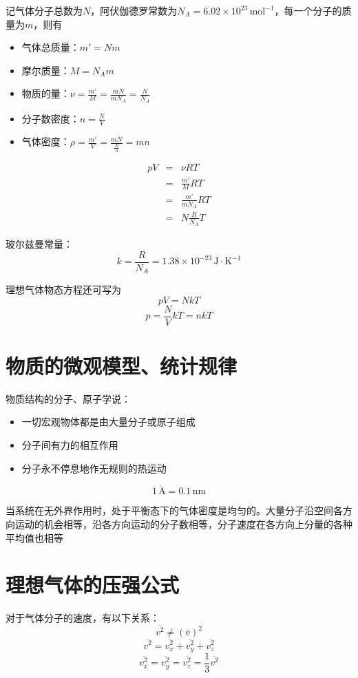 \documentclass[12pt, a4paper, twoside]{ctexbook}
\begin{document}
记气体分子总数为$N$，阿伏伽德罗常数为$N_A=6.02\times10^{23}\,\mathrm{mol}^{-1}$，每一个分子的质量为$m$，则有
\begin{itemize}
    \item {\sonti 气体总质量}：$m'=Nm$
    \item {\sonti 摩尔质量}：$M=N_Am$
    \item {\sonti 物质的量}：$\nu=\frac{m'}{M}=\frac{mN}{mN_A}=\frac{N}{N_A}$
    \item {\sonti 分子数密度}：$n=\frac{N}{V}$
    \item {\sonti 气体密度}：$\rho=\frac{m'}{V}=\frac{mN}{\frac{N}{n}}=mn$
\end{itemize}
\begin{eqnarray}
    pV&=&\nu RT \nonumber      \\
    ~&=&\frac{m'}{M}RT \nonumber    \\
    ~&=&\frac{m'}{mN_A}RT \nonumber		\\
    ~&=&N\frac{R}{N_A}T \nonumber
\end{eqnarray}

{\sonti 玻尔兹曼常量}：
$$
k=\frac{R}{N_A}=1.38\times10^{-23}\,\mathrm{J}\cdot\mathrm{K}^{-1}
$$

理想气体物态方程还可写为
$$
pV=NkT
$$
$$
p=\frac{N}{V}kT=nkT
$$
\section{物质的微观模型、统计规律}
物质结构的分子、原子学说：
\begin{itemize}
    \item 一切宏观物体都是由大量分子或原子组成
    \item 分子间有力的相互作用
    \item 分子永不停息地作无规则的热运动
\end{itemize}
$$
1\,\mathring{\mathrm{A}}=0.1\,\mathrm{nm}
$$

当系统在无外界作用时，处于平衡态下的气体密度是均匀的。大量分子沿空间各方向运动的机会相等，沿各方向运动的分子数相等，分子速度在各方向上分量的各种平均值也相等
\section{理想气体的压强公式}
对于气体分子的速度，有以下关系：
$$
\overline{v^2}\ne \left(\overline{v}\right)^2
$$
$$
\overline{v^2}=\overline{v_x^2}+\overline{v_y^2}+\overline{v_z^2}
$$
$$
\overline{v_x^2}=\overline{v_y^2}=\overline{v_z^2}=\frac{1}{3}\overline{v^2}
$$
\end{document}
